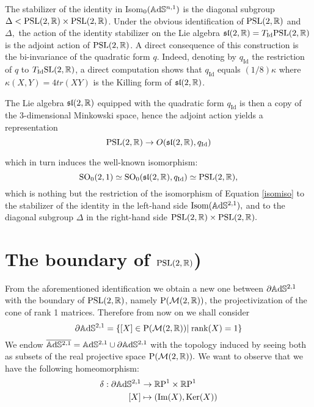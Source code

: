 The stabilizer of the identity in Isom$_0(\mathbb{A}\mathrm{d}\mathbb{S}^{n,1})$ is the diagonal subgroup $\Delta<\text{PSL}(2,\mathbb{R})\times\text{PSL}(2,\mathbb{R})$. Under the obvious identification of $\text{PSL}(2,\mathbb{R})$ and $\Delta,$ the action of the identity stabilizer on the Lie algebra $\mathfrak{sl}(2,\mathbb{R})=T_{\text{Id}}\text{PSL}(2,\mathbb{R})$ is the adjoint action of $\text{PSL}(2,\mathbb{R})$. A direct consequence of this construction is the bi-invariance of the quadratic form $q$. Indeed, denoting by $q_{\text{Id}}$ the restriction of $q$ to $T_{\text{Id}}\text{SL}(2,\mathbb{R})$, a direct computation shows that $q_\text{Id}$ equals $(1/8)\kappa$ where $\kappa(X,Y)=4tr(XY)$ is the Killing form of $\mathfrak{sl}(2, \mathbb{R})$.

\begin{observation}\label{311}
    The Lie algebra $\mathfrak{sl}(2,\mathbb{R})$ equipped with the quadratic form $q_{\text{Id}}$ is then a copy of the 3-dimensional Minkowski space, hence the adjoint action yields a representation 
    \[
        \text{PSL}(2,\mathbb{R})\to O(\mathfrak{sl}(2,\mathbb{R}),q_{\text{Id}})
    \]

which in turn induces the well-known isomorphism: 
\[
    \text{SO}_0(2,1)\simeq\text{SO}_0(\mathfrak{sl}(2,\mathbb{R}), q_\text{Id})\simeq \text{PSL}(2,\mathbb{R}),
\] which is nothing but the restriction of the isomorphism of Equation \ref{isomiso} to the stabilizer of the identity in the left-hand side $\text{Isom}(\mathbb{A}\mathrm{d}\mathbb{S}^{2,1}),$ and to the diagonal subgroup $\Delta$ in the right-hand side $\text{PSL}(2,\mathbb{R})\times\text{PSL}(2,\mathbb{R}).$
\end{observation}

\section{The boundary of $\text{PSL}(2,\mathbb{R})$)} 
From the aforementioned identification we obtain a new one between $\partial\mathbb{A}\mathrm{d}\mathbb{S}^{2,1}$ with the boundary of $\text{PSL}(2,\mathbb{R})$, namely $\text{P}(\mathcal{M}(2,\mathbb{R}))$, the projectivization of the cone of rank 1 matrices. Therefore from now on we shall consider 
\[
    \partial\mathbb{A}\mathrm{d}\mathbb{S}^{2,1}=\{[X]\in\text{P}(\mathcal{M}(2,\mathbb{R}))|\;\text{rank}(X)=1\}
\]
We endow $\overline{\mathbb{A}\mathrm{d}\mathbb{S}^{2,1}}=\mathbb{A}\mathrm{d}\mathbb{S}^{2,1}\cup\partial\mathbb{A}\mathrm{d}\mathbb{S}^{2,1}$ with the topology induced by seeing both as subsets of the real projective space $\text{P}(\mathcal{M}(2,\mathbb{R})).$ We want to observe that we have the following homeomorphism: 
\begin{align*}\label{delta}
    \delta:\partial\mathbb{A}\mathrm{d}\mathbb{S}^{2,1}&\rightarrow\mathbb{R}\text{P}^1\times\mathbb{R}\text{P}^1\\
    [X]&\mapsto (\text{Im}(X),\text{Ker}(X))
\end{align*}


